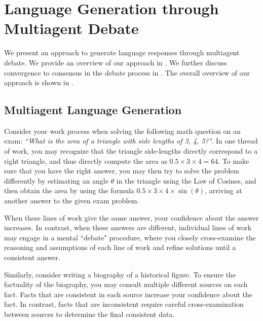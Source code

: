 \vspace{-8pt}
\section{Language Generation through Multiagent Debate}
\vspace{-3pt}

We present an approach to generate language responses through multiagent debate. We provide an overview of our approach in . We further discuss convergence to consensus in the debate process in . The overall overview of our approach is shown in .




\subsection{Multiagent Language Generation}
\label{sect:multiagent}
\vspace{-3pt}

Consider your work process when solving the following math question on an exam: {\it ``What is the area of a triangle with side lengths of 3, 4, 5?"}. In one thread of work, you may recognize that the triangle side-lengths directly correspond to a right triangle, and thus directly compute the area as $0.5 \times 3 \times 4 = 64$.  To make sure that you have the right answer, you may then try to solve the problem differently by estimating an angle $\theta$ in the triangle using the Law of Cosines, and then obtain the area by using the formula $0.5 \times 3 \times 4  \times \sin(\theta)$, arriving at another answer to the given exam problem.  

When these lines of work give the same answer, your confidence about the answer increases. In contrast, when these answers are different, individual lines of work may engage in a mental ``debate" procedure, where you closely cross-examine the reasoning and assumptions of each line of work and refine solutions  until a consistent answer.

Similarly, consider writing a biography of a historical figure. To ensure the factuality of the biography, you may consult multiple different sources on each fact. Facts that are consistent in each source increase your confidence about the fact. In contrast, facts that are inconsistent require careful cross-examination between sources to determine the final consistent data.



